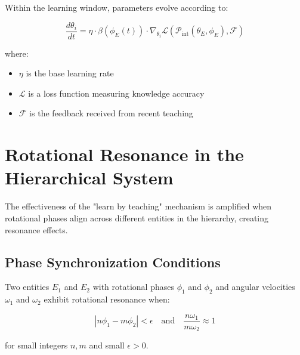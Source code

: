 \begin{theorem}
Within the learning window, parameters evolve according to:

\begin{equation}
\frac{d\theta_i}{dt} = \eta \cdot \beta(\phi_E(t)) \cdot \nabla_{\theta_i} \mathcal{L}(\mathcal{P}_{\text{int}}(\theta_E, \phi_E), \mathcal{F})
\end{equation}

where:
\begin{itemize}
    \item $\eta$ is the base learning rate
    \item $\mathcal{L}$ is a loss function measuring knowledge accuracy
    \item $\mathcal{F}$ is the feedback received from recent teaching
\end{itemize}
\end{theorem}

\section{Rotational Resonance in the Hierarchical System}

The effectiveness of the "learn by teaching" mechanism is amplified when rotational phases align across different entities in the hierarchy, creating resonance effects.

\subsection{Phase Synchronization Conditions}

\begin{definition}
Two entities $E_1$ and $E_2$ with rotational phases $\phi_1$ and $\phi_2$ and angular velocities $\omega_1$ and $\omega_2$ exhibit rotational resonance when:

\begin{equation}
|n\phi_1 - m\phi_2| < \epsilon \quad \text{and} \quad \frac{n\omega_1}{m\omega_2} \approx 1
\end{equation}

for small integers $n, m$ and small $\epsilon > 0$.
\end{definition}


